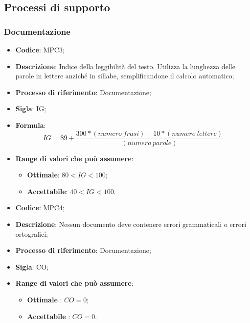 \subsection{Processi di supporto}
\subsubsection{Documentazione}
\vspace{-1cm}
\begin{itemize}
	\item \textbf{Codice}: MPC3;
	\item \textbf{Descrizione}: Indice della leggibilità del testo. Utilizza la lunghezza delle parole in lettere anziché in sillabe, semplificandone il calcolo automatico;
	\item \textbf{Processo di riferimento}: Documentazione;
	\item \textbf{Sigla}: IG;
	\item \textbf{Formula}: \[ IG = 89 + \frac{300 \ast (numero \ frasi) - 10 \ast (numero \ lettere)}{(numero \ parole)} \]
	\item \textbf{Range di valori che può assumere}:
		\begin{itemize}
			\item \textbf{Ottimale}: $80 < IG < 100$;
			\item \textbf{Accettabile}: $40 < IG < 100$.
		\end{itemize}
\end{itemize}
\vspace{-1cm}
\begin{itemize}
	\item \textbf{Codice}: MPC4;
	\item \textbf{Descrizione}: Nessun documento deve contenere errori grammaticali o errori ortografici;
	\item \textbf{Processo di riferimento}: Documentazione;
	\item \textbf{Sigla}: CO;
	\item \textbf{Range di valori che può assumere}:
		\begin{itemize}
			\item \textbf{Ottimale} : $CO = 0$;
			\item \textbf{Accettabile} : $CO = 0$.
		\end{itemize}
\end{itemize}

